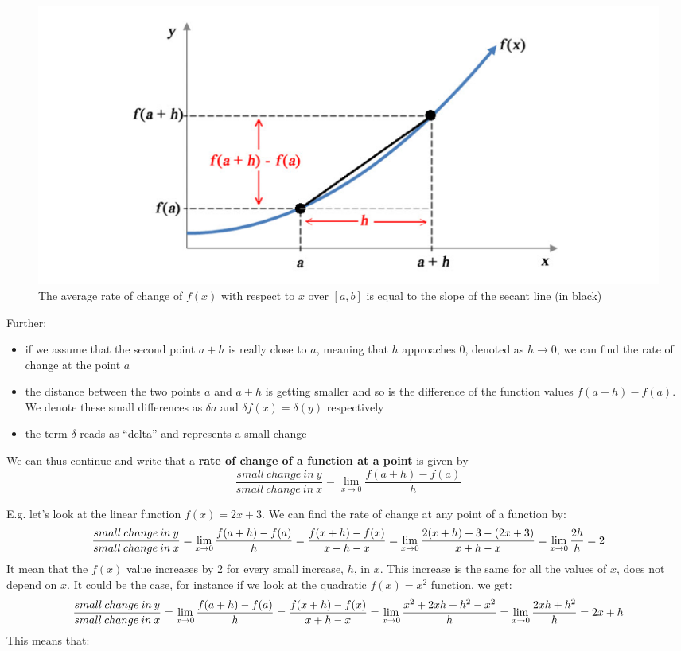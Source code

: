 \documentclass[
]{book}
\providecommand{\tightlist}{%
  \setlength{\itemsep}{0pt}\setlength{\parskip}{0pt}}
\theoremstyle{definition}
\theoremstyle{definition}
\theoremstyle{definition}
\theoremstyle{remark}
\begin{document}
\begin{figure}

{\centering \includegraphics{figures/precourse/math-differentiation-02} 

}

\caption{The average rate of change of $f(x)$ with respect to $x$ over $[a, b]$ is equal to the slope of the secant line (in black)}\label{fig:diff-02}
\end{figure}

Further:

\begin{itemize}
\tightlist
\item
  if we assume that the second point \(a+h\) is really close to \(a\), meaning that \(h\) approaches 0, denoted as \(h \rightarrow 0\), we can find the rate of change at the point \(a\)
\item
  the distance between the two points \(a\) and \(a+h\) is getting smaller and so is the difference of the function values \(f(a+h) - f(a)\). We denote these small differences as \(\delta a\) and \(\delta f(x) = \delta(y)\) respectively
\item
  the term \(\delta\) reads as ``delta'' and represents a small change
\end{itemize}

We can thus continue and write that a \textbf{rate of change of a function at a point} is given by
\begin{equation}
\frac{small\:change\:in\:y}{small\:change\:in\:x} = \lim_{x\to0}\frac{f(a+h)-f(a)}{h}
\label{eq:diff-point}
\end{equation}

E.g. let's look at the linear function \(f(x) = 2x+3\). We can find the rate of change at any point of a function by:
\[\frac{small\:change\:in\:y}{small\:change\:in\:x} = \lim_{x\to0}\frac{f(a+h)-f(a)}{h} = \\\frac{f(x+h)-f(x)}{x+h-x}= \lim_{x\to0}\frac{2(x+h)+3-(2x+3)}{x+h-x}=\lim_{x\to0}\frac{2h}{h}=2\]
It mean that the \(f(x)\) value increases by 2 for every small increase, \(h\), in \(x\). This increase is the same for all the values of \(x\), does not depend on \(x\). It could be the case, for instance if we look at the quadratic \(f(x)=x^2\) function, we get:
\[\frac{small\:change\:in\:y}{small\:change\:in\:x} = \lim_{x\to0}\frac{f(a+h)-f(a)}{h} =\\ \frac{f(x+h)-f(x)}{x+h-x}=\lim_{x\to0}\frac{x^2+2xh+h^2-x^2}{h}=\lim_{x\to0}\frac{2xh+h^2}{h}=2x+h\]
This means that:
\end{document}
